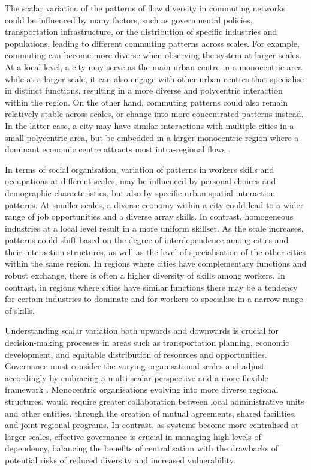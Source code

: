 \documentclass[11pt, a4paper]{article}
\begin{document}
The scalar variation of the patterns of flow diversity in commuting networks could be influenced by many factors, such as governmental policies, transportation infrastructure, or the distribution of specific industries and populations, leading to different commuting patterns across scales. For example, commuting can become more diverse when observing the system at larger scales. At a local level, a city may serve as the main urban centre in a monocentric area while at a larger scale, it can also engage with other urban centres that specialise in distinct functions, resulting in a more diverse and polycentric interaction within the region. On the other hand, commuting patterns could also remain relatively stable across scales, or change into more concentrated patterns instead. In the latter case, a city may have similar interactions with multiple cities in a small polycentric area, but be embedded in a larger monocentric region where a dominant economic centre attracts most intra-regional flows \citep{Lowe1998}.

In terms of social organisation, variation of patterns in workers skills and occupations at different scales, may be influenced by personal choices and demographic characteristics, but also by specific urban spatial interaction patterns. At smaller scales, a diverse economy within a city could lead to a wider range of job opportunities and a diverse array skills. In contrast, homogeneous industries at a local level result in a more uniform skillset. As the scale increases, patterns could shift based on the degree of interdependence among cities and their interaction structures, as well as the level of specialisation of the other cities within the same region. In regions where cities have complementary functions and robust exchange, there is often a higher diversity of skills among workers. In contrast, in regions where cities have similar functions there may be a tendency for certain industries to dominate and for workers to specialise in a narrow range of skills. 

Understanding scalar variation both upwards and downwards is crucial for decision-making processes in areas such as transportation planning, economic development, and equitable distribution of resources and opportunities. Governance must consider the varying organisational scales and adjust accordingly by embracing a multi-scalar perspective and a more flexible framework \citep{Anderies2006,Cumming2006}. Monocentric organisations evolving into more diverse regional structures, would require greater collaboration between local administrative units and other entities, through the creation of mutual agreements, shared facilities, and joint regional programs. In contrast, as systems become more centralised at larger scales, effective governance is crucial in managing high levels of dependency, balancing the benefits of centralisation with the drawbacks of potential risks of reduced diversity and increased vulnerability.  
\end{document}
